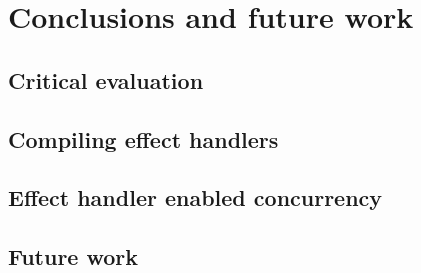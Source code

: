 \documentclass[12pt,mscres,cdtppar,twoside,openright,logo,rightchapter,normalheadings]{infthesis}
\theoremstyle{definition}
\begin{document}
\chapter{Conclusions and future work}
\label{ch:conclusions}

\section{Critical evaluation}
\label{sec:criticaleval}

\section{Compiling effect handlers}
\label{sec:conclude-compiling}

\section{Effect handler enabled concurrency}
\label{sec:conclude-concurrency}

\section{Future work}
\label{sec:futurework}



%

\singlespace



\end{document}
